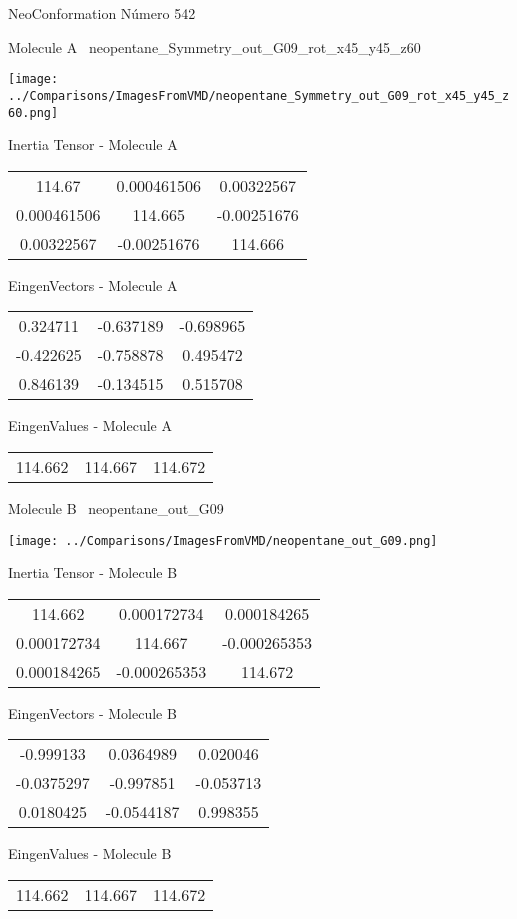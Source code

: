 \vtab[-3cm]
\begin{center}
{\large NeoConformation \tab Número 542}
\end{center}
\begin{multicols}{2}
\begin{center}

Molecule A \
neopentane\_Symmetry\_out\_G09\_rot\_x45\_y45\_z60

\texttt{[image: ../Comparisons/ImagesFromVMD/neopentane\_Symmetry\_out\_G09\_rot\_x45\_y45\_z60.png]}

Inertia Tensor - Molecule A \\
\begin{tabular}{|c c c|}
114.67	 & 	0.000461506	 & 	0.00322567	 \\
0.000461506	 & 	114.665	 & 	-0.00251676	 \\
0.00322567	 & 	-0.00251676	 & 	114.666
\end{tabular}

\vtab
 EingenVectors - Molecule A     \\
\begin{tabular}{|c c c|}
0.324711	 & 	-0.637189	 & 	-0.698965	 \\
-0.422625	 & 	-0.758878	 & 	0.495472	 \\
0.846139	 & 	-0.134515	 & 	0.515708
\end{tabular}

\vtab
 EingenValues - Molecule A     \\
\begin{tabular}{|c c c|}
114.662	 & 	114.667	 & 	114.672	 \\
\end{tabular}
\columnbreak

Molecule B \
neopentane\_out\_G09

\texttt{[image: ../Comparisons/ImagesFromVMD/neopentane\_out\_G09.png]}

Inertia Tensor - Molecule B \\
\begin{tabular}{|c c c|}
114.662	 & 	0.000172734	 & 	0.000184265	 \\
0.000172734	 & 	114.667	 & 	-0.000265353	 \\
0.000184265	 & 	-0.000265353	 & 	114.672
\end{tabular}

\vtab
 EingenVectors - Molecule B     \\
\begin{tabular}{|c c c|}
-0.999133	 & 	0.0364989	 & 	0.020046	 \\
-0.0375297	 & 	-0.997851	 & 	-0.053713	 \\
0.0180425	 & 	-0.0544187	 & 	0.998355
\end{tabular}

\vtab
 EingenValues - Molecule B     \\
\begin{tabular}{|c c c|}
114.662	 & 	114.667	 & 	114.672	 \\
\end{tabular}

\end{center}
\end{multicols}


